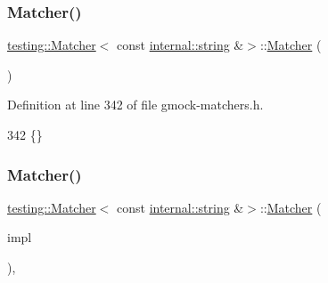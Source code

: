 \subsubsection{\texorpdfstring{Matcher()}{Matcher()}\hspace{0.1cm}{\footnotesize\ttfamily [1/4]}}
{\footnotesize\ttfamily \hyperlink{classtesting_1_1Matcher}{testing\+::\+Matcher}$<$ const \hyperlink{namespacetesting_1_1internal_a8e8ff5b11e64078831112677156cb111}{internal\+::string} \&$>$\+::\hyperlink{classtesting_1_1Matcher}{Matcher} (\begin{DoxyParamCaption}{ }\end{DoxyParamCaption})\hspace{0.3cm}{\ttfamily [inline]}}



Definition at line 342 of file gmock-\/matchers.\+h.


\begin{DoxyCode}
342 \{\}
\end{DoxyCode}
\mbox{\label{classtesting_1_1Matcher_3_01const_01internal_1_1string_01_6_4_aa35956335ee37d048c49945b904c1fb9}} 
\subsubsection{\texorpdfstring{Matcher()}{Matcher()}\hspace{0.1cm}{\footnotesize\ttfamily [2/4]}}
{\footnotesize\ttfamily \hyperlink{classtesting_1_1Matcher}{testing\+::\+Matcher}$<$ const \hyperlink{namespacetesting_1_1internal_a8e8ff5b11e64078831112677156cb111}{internal\+::string} \&$>$\+::\hyperlink{classtesting_1_1Matcher}{Matcher} (\begin{DoxyParamCaption}\item[{const \hyperlink{classtesting_1_1MatcherInterface}{Matcher\+Interface}$<$ const \hyperlink{namespacetesting_1_1internal_a8e8ff5b11e64078831112677156cb111}{internal\+::string} \&$>$ $\ast$}]{impl }\end{DoxyParamCaption})\hspace{0.3cm}{\ttfamily [inline]}, {\ttfamily [explicit]}}



